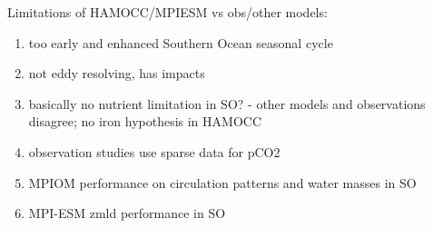 \documentclass[12pt]{article}
\begin{document}
Limitations of HAMOCC/MPIESM vs obs/other models:
\begin{enumerate}
\item too early and enhanced Southern Ocean seasonal cycle \citep{Nevison2016}
\item not eddy resolving, has impacts \citep{Stoessel2015}
\item basically no nutrient limitation in SO? - other models and observations disagree; no iron hypothesis in HAMOCC
\item observation studies use sparse data for pCO2 \citep{landschuetzer2015}
\item MPIOM performance on circulation patterns and water masses in SO \citep{Sallee2013a} %
\item MPI-ESM zmld performance in SO \citep{Sallee2013}
\end{enumerate} 







\newpage
\baselineskip18pt
%


\end{document}

